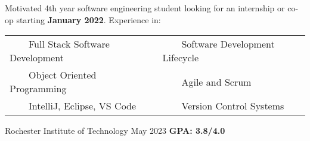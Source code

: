 \documentclass{awesome-cv}
\newcommand{\tabitem}{~~\llap{\textbullet}~~}
\begin{document}
	\makecvheader[C]

	\makecvfooter
		{}
		{}
		{}

		\vspace{-0.1cm}
		
		Motivated 4th year software engineering student looking for an internship or co-op starting \textbf{January 2022}. Experience in:
		
		\begin{center}
		\begin{tabular}{l@{\hskip 2cm}l}
		\tabitem Full Stack Software Development & \tabitem Software Development Lifecycle \\
		\tabitem Object Oriented Programming & \tabitem Agile and Scrum \\
		\tabitem IntelliJ, Eclipse, VS Code & \tabitem Version Control Systems
		\end{tabular}





		\end{center}
		\vspace{-0.25cm}
	
		\vspace{-0.15cm}
		\begin{cventries}
			\cventryB
				{}
				{Rochester Institute of Technology\small{\textnormal{\color{graytext}{\enskip B.S. Software Engineering}}}}
				{May 2023}
				{}
                		{\textbf{GPA: 3.8/4.0}}
		\end{cventries}
		
\end{document}
